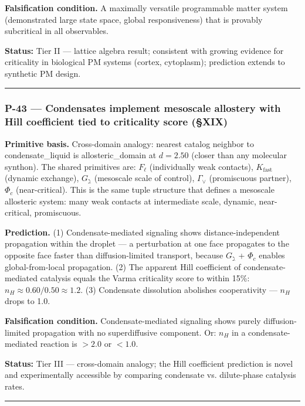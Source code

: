 \documentclass[12pt,a4paper]{article}
\begin{document}
\textbf{Falsification condition.} A maximally versatile programmable matter system (demonstrated large state space, global responsiveness) that is provably subcritical in all observables.

\textbf{Status:} Tier II --- lattice algebra result; consistent with growing evidence for criticality in biological PM systems (cortex, cytoplasm); prediction extends to synthetic PM design.

\begin{center}
\rule{0.5\textwidth}{0.4pt}
\end{center}

\subsubsection{P-43 --- Condensates implement mesoscale allostery with Hill coefficient tied to criticality score (§XIX)}

\textbf{Primitive basis.} Cross-domain analogy: nearest catalog neighbor to condensate\_liquid is allosteric\_domain at $d = 2.50$ (closer than any molecular synthon). The shared primitives are: $F_\ell$ (individually weak contacts), $K_\text{fast}$ (dynamic exchange), $G_\gimel$ (mesoscale scale of control), $\Gamma_\vee$ (promiscuous partner), $\Phi_c$ (near-critical). This is the same tuple structure that defines a mesoscale allosteric system: many weak contacts at intermediate scale, dynamic, near-critical, promiscuous.

\textbf{Prediction.} (1) Condensate-mediated signaling shows distance-independent propagation within the droplet --- a perturbation at one face propagates to the opposite face faster than diffusion-limited transport, because $G_\gimel$ + $\Phi_c$ enables global-from-local propagation. (2) The apparent Hill coefficient of condensate-mediated catalysis equals the Varma criticality score to within 15\%: $n_H \approx 0.60 / 0.50 \approx 1.2$. (3) Condensate dissolution abolishes cooperativity --- $n_H$ drops to 1.0.

\textbf{Falsification condition.} Condensate-mediated signaling shows purely diffusion-limited propagation with no superdiffusive component. Or: $n_H$ in a condensate-mediated reaction is $> 2.0$ or $< 1.0$.

\textbf{Status:} Tier III --- cross-domain analogy; the Hill coefficient prediction is novel and experimentally accessible by comparing condensate vs. dilute-phase catalysis rates.

\begin{center}
\rule{0.5\textwidth}{0.4pt}
\end{center}
\end{document}
